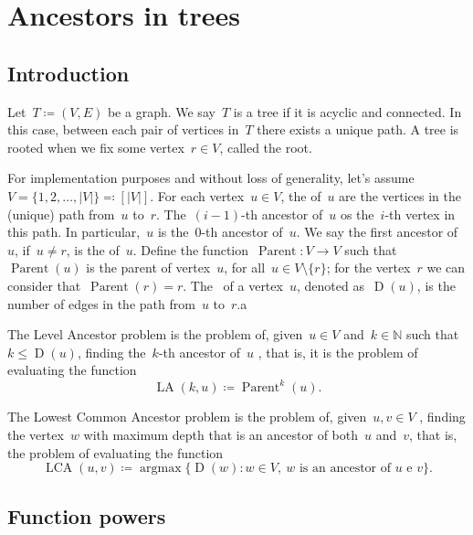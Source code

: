 \documentclass[main.tex]{subfiles}
\begin{document}
\providecommand{\Par}{\operatorname{Parent}}
\newcommand{\LA}{\operatorname{LA}}
\newcommand{\Dep}{\operatorname{D}}
\newcommand{\LCA}{\operatorname{LCA}}
\newcommand{\argmax}{\operatorname{argmax}}


\chapter{Ancestors in trees} \label{cap:ancestrais}

\section{Introduction}


Let~$T \coloneqq (V, E)$ be a graph. We say~$T$ is a tree if it is acyclic and connected. In this case, between each pair of vertices in~$T$ there exists a unique path. A tree is rooted when we fix some vertex~${r \in V}$, called the root.

For implementation purposes and without loss of generality, let's assume~$V = \{1, 2, \ldots, |V|\} \eqqcolon [|V|]$.
For each vertex~${u \in V}$, the  of~$u$ are the vertices in the (unique) path from~$u$ to~$r$. The~\mbox{$(i-1)$-th} ancestor of~$u$ os the~$i$-th vertex in this path. In particular,~$u$ is the~$0$-th ancestor of~$u$. We say the first ancestor of~$u$, if~$u \neq r$, is the  of~$u$. Define the function~${\Par: V \rightarrow V}$ such that~$\Par(u)$ is the parent of vertex~$u$, for all~$u \in V \setminus \{r\}$; for the vertex~$r$ we can consider that~$\Par(r) = r$. The~ of a vertex~$u$, denoted as~$\Dep(u)$, is the number of edges in the path from~$u$ to~$r$.a

The Level Ancestor problem is the problem of, given~$u \in V$ and~$k \in \mathbb{N}$ such that~$k \leq \Dep(u)$, finding the~$k$-th ancestor of~$u$ , that is, it is the problem of evaluating the function
$$\LA(k, u) \coloneqq \Par^k(u). $$

The Lowest Common Ancestor problem is the problem of, given~$u, v \in V$ , finding the vertex~$w$ with maximum depth that is an ancestor of both~$u$ and~$v$, that is, the problem of evaluating the function
$$\LCA(u, v) \coloneqq \argmax\{\Dep(w) : w \in V,\ w \text{ is an ancestor of $u$ e $v$}\}. $$

\section{Function powers} \label{sec:potfunc}
\end{document}
